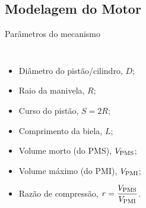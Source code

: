 \subsection{Modelagem do Motor}

    \begin{frame}{Parâmetros do mecanismo}\vspace*{-2em}
        \begin{columns}
        \begin{itemize}
            \item<1-> \alert{Diâmetro} do pistão/cilindro, \alert{$D$};
            \item<2-> \alert{Raio} da manivela, \alert{$R$};
            \item<3-> \alert{Curso} do pistão, \alert{$S = 2R$};
            \item<4-> \alert{Comprimento} da biela, \alert{$L$};
            \item<5-> \alert{Volume} morto (do PMS), \alert{${V_{\mathrm{PMS}}}$};
            \item<6-> \alert{Volume} máximo (do PMI), \alert{${V_{\mathrm{PMI}}}$};
            \item<7-> \alert{Razão de compressão}, \alert{$r = \dfrac{{V_{\mathrm{PMS}}}}{{V_{\mathrm{PMI}}}}$}.
        \end{itemize}
        \begin{center}
        \end{center}
        \end{columns}
    \end{frame}


